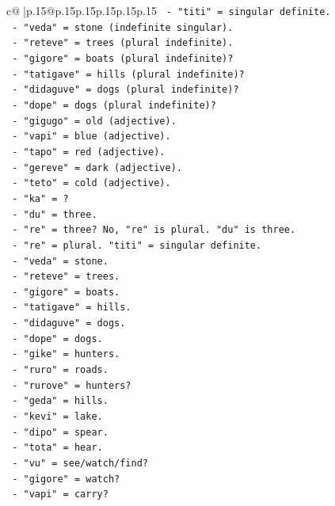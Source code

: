 \documentclass{article}
\begin{document}
{\begin{supertabular}{c@{$\;$}|p{.15\linewidth}@{}p{.15\linewidth}p{.15\linewidth}p{.15\linewidth}p{.15\linewidth}p{.15\linewidth}}
{{{\texttt{  {-} "titi" = singular definite.} \\
\texttt{  {-} "veda" = stone (indefinite singular).} \\
\texttt{  {-} "reteve" = trees (plural indefinite).} \\
\texttt{  {-} "gigore" = boats (plural indefinite)?} \\
\texttt{  {-} "tatigave" = hills (plural indefinite)?} \\
\texttt{  {-} "didaguve" = dogs (plural indefinite)?} \\
\texttt{  {-} "dope" = dogs (plural indefinite)?} \\
\texttt{  {-} "gigugo" = old (adjective).} \\
\texttt{  {-} "vapi" = blue (adjective).} \\
\texttt{  {-} "tapo" = red (adjective).} \\
\texttt{  {-} "gereve" = dark (adjective).} \\
\texttt{  {-} "teto" = cold (adjective).} \\
\texttt{  {-} "ka" = ?} \\
\texttt{  {-} "du" = three.} \\
\texttt{  {-} "re" = three? No, "re" is plural. "du" is three.} \\
\texttt{  {-} "re" = plural. "titi" = singular definite.} \\
\texttt{  {-} "veda" = stone.} \\
\texttt{  {-} "reteve" = trees.} \\
\texttt{  {-} "gigore" = boats.} \\
\texttt{  {-} "tatigave" = hills.} \\
\texttt{  {-} "didaguve" = dogs.} \\
\texttt{  {-} "dope" = dogs.} \\
\texttt{  {-} "gike" = hunters.} \\
\texttt{  {-} "ruro" = roads.} \\
\texttt{  {-} "rurove" = hunters?} \\
\texttt{  {-} "geda" = hills.} \\
\texttt{  {-} "kevi" = lake.} \\
\texttt{  {-} "dipo" = spear.} \\
\texttt{  {-} "tota" = hear.} \\
\texttt{  {-} "vu" = see/watch/find?} \\
\texttt{  {-} "gigore" = watch?} \\
\texttt{  {-} "vapi" = carry?} \\
}}}
\end{supertabular}}
\end{document}
